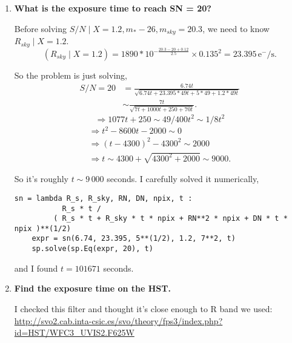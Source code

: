 \documentclass[12pt,letterpaper]{article}
\begin{document}
\begin{enumerate}
    \item {\bf What is the exposure time to reach SN = 20?}

    Before solving $ S/N \mid X=1.2, m_{*}-26, m_{sky}=20.3 $, 
    we need to know $ R_{sky} \mid X=1.2 $.
    \begin{equation}
        (R_{sky} \mid X=1.2) = 1890 * 10^{ - \frac{20.3 - 20 + 0.12}{2.5} }
            \times 0.135^2
            = 23.395 \, \mathrm{e^- / s}.
    \end{equation}

    So the problem is just solving,
    \begin{equation}
        \begin{split}
            S/N = 20 
                &= \frac{ 6.74 t }{ \sqrt{ 6.74t + 23.395*49t + 5*49 + 1.2*49t } }\\
                &\sim \frac{7t}{\sqrt{7t + 1000t + 250 + 70t}}.
        \end{split}
    \end{equation}
    \begin{equation*}
        \Rightarrow 1077t + 250 \sim 49 / 400 t^2 \sim 1/8 t^2
    \end{equation*}
    \begin{equation*}
        \begin{split}
            \Rightarrow t^2 - 8600t - 2000 \sim 0\\
            \Rightarrow (t - 4300)^2 - 4300^2 \sim 2000\\
            \Rightarrow t \sim 4300 + \sqrt{ 4300^2 + 2000 } \sim 9000.
        \end{split}
    \end{equation*}

    So it's roughly $t \sim 9\,000$ seconds.  
    I carefully solved it numerically, 

    \begin{lstlisting}[style = python]
    sn = lambda R_s, R_sky, RN, DN, npix, t : 
           R_s * t /
         ( R_s * t + R_sky * t * npix + RN**2 * npix + DN * t * npix )**(1/2)    
    expr = sn(6.74, 23.395, 5**(1/2), 1.2, 7**2, t)
    sp.solve(sp.Eq(expr, 20), t)
    \end{lstlisting} 

    and I found $t = 101671$ seconds.

    \item {\bf Find the exposure time on the HST.}
    
    I checked this filter and thought it's close enough to R band we used:
    \url{http://svo2.cab.inta-csic.es/svo/theory/fps3/index.php?id=HST/WFC3_UVIS2.F625W}
    

\end{enumerate}
\end{document}
